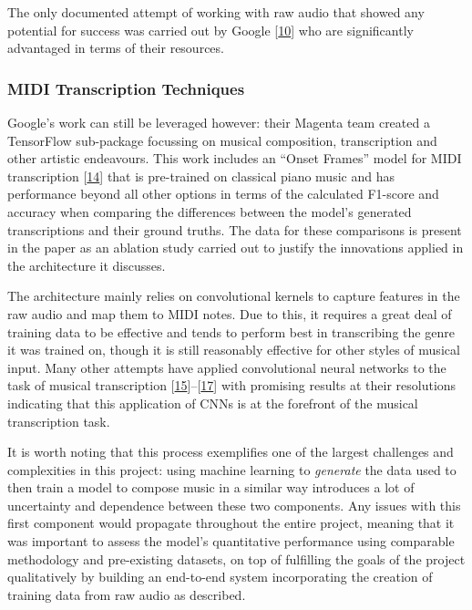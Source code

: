 \documentclass[12pt,]{article}
\begin{document}
The only documented attempt of working with raw audio that showed any
potential for success was carried out by Google
{[}\protect\hyperlink{ref-oord2016wavenet}{10}{]} who are significantly
advantaged in terms of their resources.

\hypertarget{midi-transcription-techniques}{%
\subsubsection{MIDI Transcription
Techniques}\label{midi-transcription-techniques}}

Google's work can still be leveraged however: their Magenta team created
a TensorFlow sub-package focussing on musical composition, transcription
and other artistic endeavours. This work includes an ``Onset Frames''
model for MIDI transcription
{[}\protect\hyperlink{ref-hawthorne2017onsets}{14}{]} that is
pre-trained on classical piano music and has performance beyond all
other options in terms of the calculated F1-score and accuracy when
comparing the differences between the model's generated transcriptions
and their ground truths. The data for these comparisons is present in
the paper as an ablation study carried out to justify the innovations
applied in the architecture it discusses.

The architecture mainly relies on convolutional kernels to capture
features in the raw audio and map them to MIDI notes. Due to this, it
requires a great deal of training data to be effective and tends to
perform best in transcribing the genre it was trained on, though it is
still reasonably effective for other styles of musical input. Many other
attempts have applied convolutional neural networks to the task of
musical transcription
{[}\protect\hyperlink{ref-bereketai}{15}{]}--{[}\protect\hyperlink{ref-sarnatskyi2017music}{17}{]}
with promising results at their resolutions indicating that this
application of CNNs is at the forefront of the musical transcription
task.

It is worth noting that this process exemplifies one of the largest
challenges and complexities in this project: using machine learning to
\emph{generate} the data used to then train a model to compose music in
a similar way introduces a lot of uncertainty and dependence between
these two components. Any issues with this first component would
propagate throughout the entire project, meaning that it was important
to assess the model's quantitative performance using comparable
methodology and pre-existing datasets, on top of fulfilling the goals of
the project qualitatively by building an end-to-end system incorporating
the creation of training data from raw audio as described.
\end{document}
